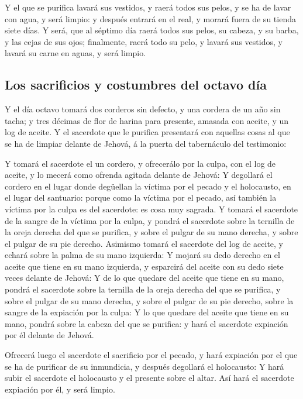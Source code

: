  Y el que se purifica lavará sus vestidos, y raerá todos sus
pelos, y se ha de lavar con agua, y será limpio: y después entrará en el
real, y morará fuera de su tienda siete días.  Y será, que
al séptimo día raerá todos sus pelos, su cabeza, y su barba, y las cejas
de sus ojos; finalmente, raerá todo su pelo, y lavará sus vestidos, y
lavará su carne en aguas, y será limpio.

\hypertarget{los-sacrificios-y-costumbres-del-octavo-duxeda}{%
\subsection{Los sacrificios y costumbres del octavo
día}\label{los-sacrificios-y-costumbres-del-octavo-duxeda}}

 Y el día octavo tomará dos corderos sin defecto, y una
cordera de un año sin tacha; y tres décimas de flor de harina para
presente, amasada con aceite, y un log de aceite.  Y el
sacerdote que le purifica presentará con aquellas cosas al que se ha de
limpiar delante de Jehová, á la puerta del tabernáculo del testimonio:

 Y tomará el sacerdote el un cordero, y ofrecerálo por la
culpa, con el log de aceite, y lo mecerá como ofrenda agitada delante de
Jehová:  Y degollará el cordero en el lugar donde degüellan
la víctima por el pecado y el holocausto, en el lugar del santuario:
porque como la víctima por el pecado, así también la víctima por la
culpa es del sacerdote: es cosa muy sagrada.  Y tomará el
sacerdote de la sangre de la víctima por la culpa, y pondrá el sacerdote
sobre la ternilla de la oreja derecha del que se purifica, y sobre el
pulgar de su mano derecha, y sobre el pulgar de su pie derecho.
 Asimismo tomará el sacerdote del log de aceite, y echará
sobre la palma de su mano izquierda:  Y mojará su dedo
derecho en el aceite que tiene en su mano izquierda, y esparcirá del
aceite con su dedo siete veces delante de Jehová:  Y de lo
que quedare del aceite que tiene en su mano, pondrá el sacerdote sobre
la ternilla de la oreja derecha del que se purifica, y sobre el pulgar
de su mano derecha, y sobre el pulgar de su pie derecho, sobre la sangre
de la expiación por la culpa:  Y lo que quedare del aceite
que tiene en su mano, pondrá sobre la cabeza del que se purifica: y hará
el sacerdote expiación por él delante de Jehová.

 Ofrecerá luego el sacerdote el sacrificio por el pecado, y
hará expiación por el que se ha de purificar de su inmundicia, y después
degollará el holocausto:  Y hará subir el sacerdote el
holocausto y el presente sobre el altar. Así hará el sacerdote expiación
por él, y será limpio.

